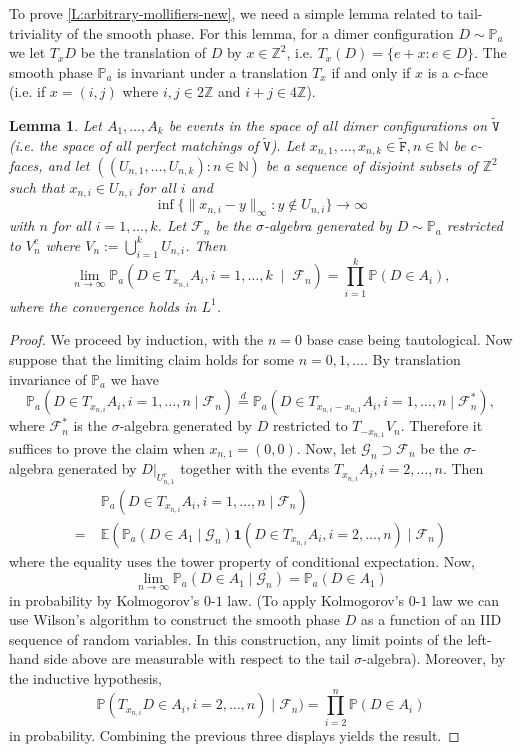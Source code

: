 \documentclass[11pt,twoside]{amsart}
\theoremstyle{plain}
\newtheorem{lem}[thm]{Lemma}
\numberwithin{quest}{section}
\theoremstyle{remark}
\numberwithin{rem}{section}
\theoremstyle{definition}
\newcommand{\Z}{\mathbb{Z}}
\newcommand{\N}{\mathbb{N}}
\renewcommand{\P}{\mathbb{P}}
\newcommand{\E}{\mathbb{E}}
\newcommand{\cF}{\mathcal{F}}
\newcommand{\eqd}{\stackrel{d}{=}}
\renewcommand{\tt}[1]{{\mathtt{#1}}}
\begin{document}
	To prove \cref{L:arbitrary-mollifiers-new}, we need a simple lemma related to tail-triviality of the smooth phase. For this lemma, for a dimer configuration $D \sim \P_a$ we let $T_x D$ be the translation of $D$ by $x \in \Z^2$, i.e. 
	$
	T_x(D) = \{ e + x : e \in D\}.
	$
	The smooth phase $\P_a$ is invariant under a translation $T_x$ if and only if $x$ is a $c$-face (i.e. if $x = (i, j)$ where $i, j \in 2 \Z$ and $i + j \in 4 \Z$).
	\begin{lem}
		\label{L:smooth-phase-mixing}
		Let $A_1, \dots, A_k$ be events in the space of all dimer configurations on $\tt{\tilde V}$ (i.e. the space of all perfect matchings of $\tt{\tilde V}$). Let $x_{n, 1}, \dots, x_{n, k} \in \tt{\tilde F}, n \in \N$ be $c$-faces, and let $((U_{n, 1}, \dots, U_{n, k}) : n \in \N)$ be a sequence of disjoint subsets of $\Z^2$ such that $x_{n, i} \in U_{n, i}$ for all $i$ and 
		$$
		\inf \{\|x_{n, i} - y\|_\infty : y \notin U_{n, i}\} \to \infty
		$$
		with $n$ for all $i = 1, \dots, k$. Let $\cF_n$ be the $\sigma$-algebra generated by $D \sim \P_a$ restricted to $V_n^c$ where $V_n := \bigcup_{i=1}^k U_{n, i}$. Then
		$$
		\lim_{n \to \infty} \P_a( D \in T_{x_{n,i}} A_i, i = 1, \dots, k \; \mid \; \cF_n) = \prod_{i=1}^k \P(D \in A_i),
		$$
		where the convergence holds in $L^1$.
	\end{lem}
	
	\begin{proof}
		We proceed by induction, with the $n = 0$ base case being tautological. Now suppose that the limiting claim holds for some $n = 0, 1, \dots$. By translation invariance of $\P_a$ we have
		$$
		\P_a( D \in T_{x_{n,i}} A_i, i = 1, \dots, n \mid \cF_n) \eqd \P_a( D \in T_{x_{n,i} - x_{n, 1}} A_i, i = 1, \dots, n \mid \cF_n^*),
		$$
		where $\cF_n^*$ is the $\sigma$-algebra generated by $D$ restricted to $T_{-x_{n, 1}} V_n$. Therefore it suffices to prove the claim when $x_{n, 1} = (0,0)$. Now, let $\mathcal G_n \supset \mathcal F_n$ be the $\sigma$-algebra generated by $D|_{U_{n, 1}^c}$ together with the events $T_{x_{n,i}} A_i, i = 2, \dots, n$. Then
		\begin{align*}
			&\P_a( D \in T_{x_{n,i}} A_i, i = 1, \dots, n \mid \cF_n) \\
			=\; &\E (\P_a(D \in A_1 \mid \mathcal G_n) \mathbf{1}(D \in T_{x_{n,i}} A_i, i = 2, \dots, n) \mid \cF_n)
		\end{align*}
		where the equality uses the tower property of conditional expectation. Now, 
		$$
		\lim_{n \to \infty} \P_a(D \in A_1 \mid \mathcal G_n) = \P_a(D \in A_1)
		$$
		in probability by Kolmogorov's $0$-$1$ law. (To apply Kolmogorov's $0$-$1$ law we can use Wilson's algorithm to construct the smooth phase $D$ as a function of an IID sequence of random variables. In this construction, any limit points of the left-hand side above are measurable with respect to the tail $\sigma$-algebra). Moreover, by the inductive hypothesis,
		$$
		\P (T_{x_{n,i}} D \in A_i, i = 2, \dots, n) \mid \cF_n) = \prod_{i=2}^n \P(D \in A_i)
		$$
		in probability. Combining the previous three displays yields the result.
	\end{proof}
	
\end{document}
